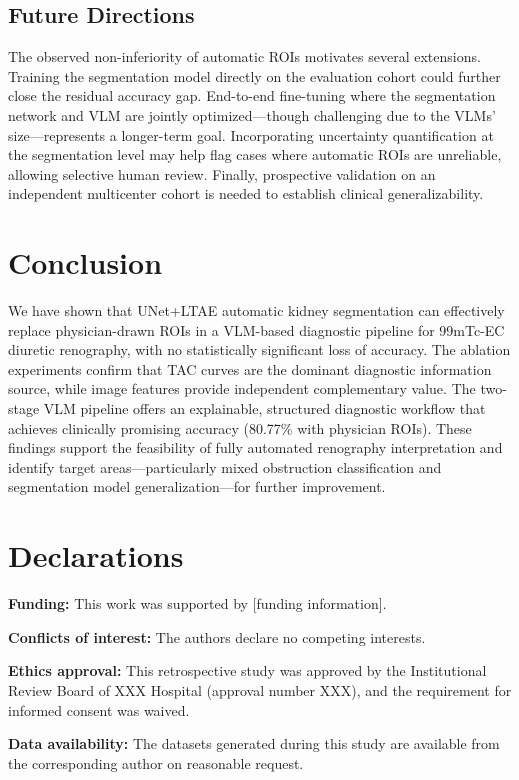 \documentclass[sn-basic]{sn-jnl}
\begin{document}
\subsection{Future Directions}

The observed non-inferiority of automatic ROIs motivates
several extensions.  Training the segmentation model directly
on the evaluation cohort could further close the residual
accuracy gap.  End-to-end fine-tuning where the segmentation
network and VLM are jointly optimized---though challenging
due to the VLMs' size---represents a longer-term goal.
Incorporating uncertainty quantification at the segmentation
level may help flag cases where automatic ROIs are
unreliable, allowing selective human review.  Finally,
prospective validation on an independent multicenter cohort
is needed to establish clinical generalizability.

\section{Conclusion}
\label{sec:conclusion}

We have shown that UNet+LTAE automatic kidney segmentation
can effectively replace physician-drawn ROIs in a VLM-based
diagnostic pipeline for 99mTc-EC diuretic renography, with
no statistically significant loss of accuracy.  The ablation
experiments confirm that TAC curves are the dominant
diagnostic information source, while image features provide
independent complementary value.  The two-stage VLM pipeline
offers an explainable, structured diagnostic workflow that
achieves clinically promising accuracy (80.77\% with
physician ROIs).  These findings support the feasibility of
fully automated renography interpretation and identify
target areas---particularly mixed obstruction classification
and segmentation model generalization---for further
improvement.

\section*{Declarations}

\noindent\textbf{Funding:} This work was supported by [funding
information].
\par\vspace{0.5em}
\noindent\textbf{Conflicts of interest:} The authors declare
no competing interests.
\par\vspace{0.5em}
\noindent\textbf{Ethics approval:} This retrospective study
was approved by the Institutional Review Board of XXX
Hospital (approval number XXX), and the requirement for
informed consent was waived.
\par\vspace{0.5em}
\noindent\textbf{Data availability:} The datasets generated
during this study are available from the corresponding author
on reasonable request.
\end{document}
